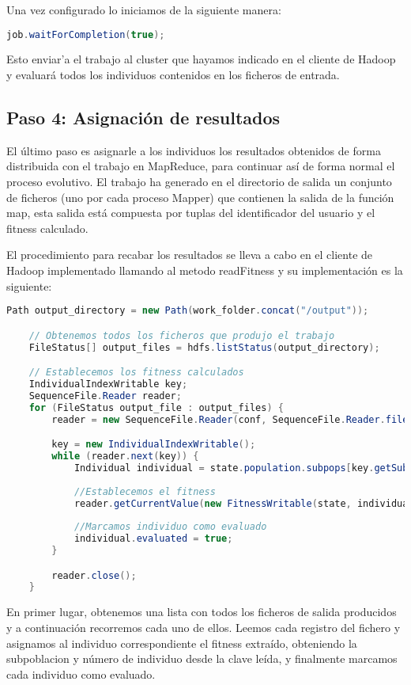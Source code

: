 Una vez configurado lo iniciamos de la siguiente manera:

\begin{lstlisting}[language=Java]
	job.waitForCompletion(true);
\end{lstlisting}

Esto enviar'a el trabajo al cluster que hayamos indicado en el cliente de Hadoop y evaluar\'a todos los individuos contenidos en los ficheros de entrada.

\subsection{Paso 4: Asignaci\'on de resultados}

El \'ultimo paso es asignarle a los individuos los resultados obtenidos de forma distribuida con el trabajo en MapReduce, para continuar así de forma normal el proceso evolutivo. El trabajo ha generado en el directorio de salida un conjunto de ficheros (uno por cada proceso Mapper) que contienen la salida de la función map, esta salida est\'a compuesta por tuplas del identificador del usuario y el fitness calculado.

El procedimiento para recabar los resultados se lleva a cabo en el cliente de Hadoop implementado llamando al metodo readFitness y su implementación es la siguiente:

\begin{lstlisting}[language=Java]
	Path output_directory = new Path(work_folder.concat("/output"));

	// Obtenemos todos los ficheros que produjo el trabajo
	FileStatus[] output_files = hdfs.listStatus(output_directory);

	// Establecemos los fitness calculados
	IndividualIndexWritable key;
	SequenceFile.Reader reader;
	for (FileStatus output_file : output_files) {
		reader = new SequenceFile.Reader(conf, SequenceFile.Reader.file(output_file.getPath()));

		key = new IndividualIndexWritable();
		while (reader.next(key)) {
			Individual individual = state.population.subpops[key.getSubpopulation()].individuals[key.getIndividual()];
			
			//Establecemos el fitness
			reader.getCurrentValue(new FitnessWritable(state, individual.fitness));
			
			//Marcamos individuo como evaluado
			individual.evaluated = true;
		}

		reader.close();
	}
\end{lstlisting}

En primer lugar, obtenemos una lista con todos los ficheros de salida producidos y a continuación recorremos cada uno de ellos. Leemos cada registro del fichero y asignamos al individuo correspondiente el fitness extraído, obteniendo la subpoblacion y n\'umero de individuo desde la clave leída, y finalmente marcamos cada individuo como evaluado.















